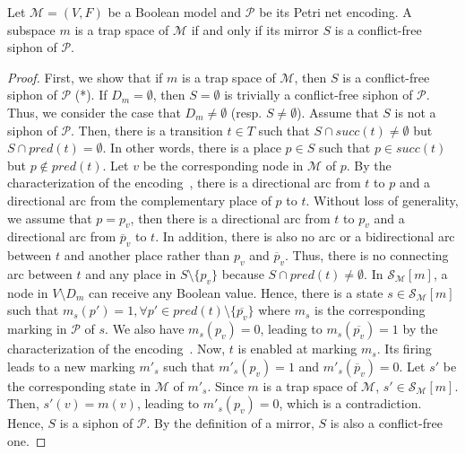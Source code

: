 \documentclass[runningheads]{llncs}
\begin{document}
\begin{theorem}%
\label{theo:ts_2_sp}

  Let \(\mathcal{M} = (V, F)\) be a Boolean model and \(\mathcal{P}\) be its Petri net encoding. A subspace \(m\) is a trap space of \(\mathcal{M}\) if and only if its mirror \(S\) is a conflict-free siphon of \(\mathcal{P}\).

\end{theorem}

\begin{proof}

  First, we show that if \(m\) is a trap space of \(\mathcal{M}\), then \(S\) is a conflict-free siphon of \(\mathcal{P}\) (*). If \(D_m = \emptyset\), then \(S = \emptyset\) is trivially a conflict-free siphon of \(\mathcal{P}\). Thus, we consider the case that \(D_m \neq \emptyset\) (resp. \(S \neq \emptyset\)). Assume that \(S\) is not a siphon of \(\mathcal{P}\). Then, there is a transition \(t \in T\) such that \(S\cap succ(t)\not =\emptyset\) but \(S\cap pred(t)=\emptyset\). In other words, there is a place \(p \in S\) such that \(p \in succ(t)\) but \(p \not \in pred(t)\). Let \(v\) be the corresponding node in \(\mathcal{M}\) of \(p\). By the characterization of the encoding~\cite{chaouiya2004qualitative}, there is a directional arc from \(t\) to \(p\) and a directional arc from the complementary place of \(p\) to \(t\). Without loss of generality, we assume that \(p = p_v\), then there is a directional arc from \(t\) to \(p_v\) and a directional arc from \(\overline{p}_v\) to \(t\). In addition, there is also no arc or a bidirectional arc between \(t\) and another place rather than \(p_v\) and \(\overline{p}_v\). Thus, there is no connecting arc between \(t\) and any place in \(S \setminus \{p_v\}\) because \(S\cap pred(t)\not =\emptyset\). In \(\mathcal{S}_{\mathcal{M}}[m]\), a node in \(V \setminus D_m\) can receive any Boolean value. Hence, there is a state \(s \in \mathcal{S}_{\mathcal{M}}[m]\) such that \(m_s(p') = 1, \forall p' \in pred(t) \setminus \{\overline{p_v}\}\) where \(m_s\) is the corresponding marking in \(\mathcal{P}\) of \(s\). We also have \(m_s(p_v) = 0\), leading to \(m_s(\overline{p_v}) = 1\) by the characterization of the encoding~\cite{chaouiya2004qualitative}. Now, \(t\) is enabled at marking \(m_s\). Its firing leads to a new marking \(m'_s\) such that \(m'_s(p_v) = 1\) and \(m'_s(\overline{p}_v) = 0\). Let \(s'\) be the corresponding state in \(\mathcal{M}\) of \(m'_s\). Since \(m\) is a trap space of \(\mathcal{M}\), \(s' \in \mathcal{S}_{\mathcal{M}}[m]\). Then, \(s'(v) = m(v)\), leading to \(m'_s(p_v) = 0\), which is a contradiction. Hence, \(S\) is a siphon of \(\mathcal{P}\). By the definition of a mirror, \(S\) is also a conflict-free one.


\end{proof}
\end{document}
